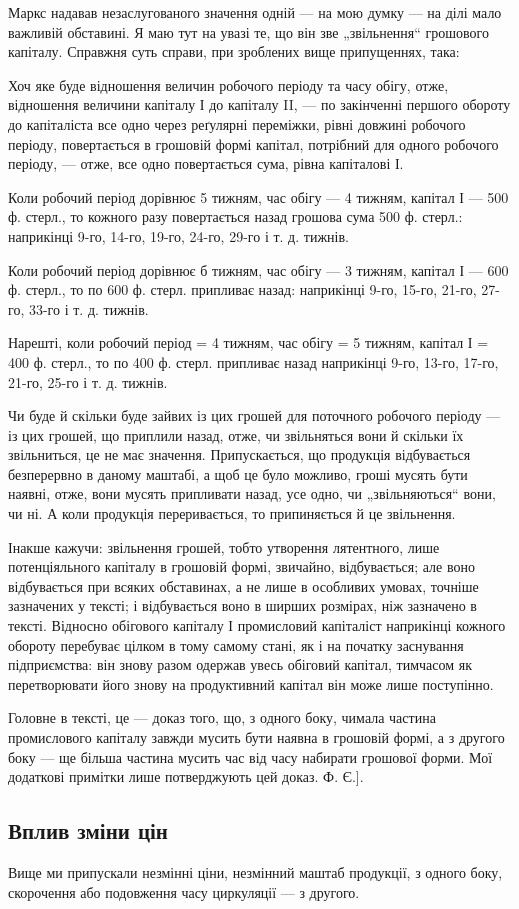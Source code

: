 \parcont{}  %
Маркс надавав незаслугованого значення одній — на мою думку — на ділі
мало важливій обставині. Я маю тут на увазі те, що він зве „звільнення“
грошового капіталу. Справжня суть справи, при зроблених вище припущеннях,
така:

Хоч яке буде відношення величин робочого періоду та часу обігу,
отже, відношення величини капіталу І до капіталу II, — по закінченні першого
обороту до капіталіста все одно через реґулярні переміжки, рівні
довжині робочого періоду, повертається в грошовій формі капітал, потрібний
для одного робочого періоду, — отже, все одно повертається сума,
рівна капіталові І.

Коли робочий період дорівнює 5 тижням, час обігу — 4 тижням, капітал
І — 500 ф. стерл., то кожного разу повертається назад грошова
сума 500 ф. стерл.: наприкінці 9-го, 14-го, 19-го, 24-го, 29-го і т. д.
тижнів.

Коли робочий період дорівнює б тижням, час обігу — 3 тижням, капітал
І — 600 ф. стерл., то по 600 ф. стерл. припливає назад: наприкінці
9-го, 15-го, 21-го, 27-го, 33-го і т. д. тижнів.

Нарешті, коли робочий період = 4 тижням, час обігу = 5 тижням,
капітал І = 400 ф. стерл., то по 400 ф. стерл. припливає назад наприкінці
9-го, 13-го, 17-го, 21-го, 25-го і т. д. тижнів.

Чи буде й скільки буде зайвих із цих грошей для поточного робочого
періоду — із цих грошей, що приплили назад, отже, чи звільняться
вони й скільки їх звільниться, це не має значення. Припускається, що
продукція відбувається безперервно в даному маштабі, а щоб це було
можливо, гроші мусять бути наявні, отже, вони мусять припливати назад,
усе одно, чи „звільняються“ вони, чи ні. А коли продукція переривається,
то припиняється й це звільнення.

Інакше кажучи: звільнення грошей, тобто утворення лятентного, лише
потенціяльного капіталу в грошовій формі, звичайно, відбувається;
але воно відбувається при всяких обставинах, а не лише в особливих умовах,
точніше зазначених у тексті; і відбувається воно в ширших розмірах,
ніж зазначено в тексті. Відносно обігового капіталу І промисловий капіталіст
наприкінці кожного обороту перебуває цілком в тому самому
стані, як і на початку заснування підприємства: він знову разом одержав
увесь обіговий капітал, тимчасом як перетворювати його знову на продуктивний
капітал він може лише поступінно.

Головне в тексті, це — доказ того, що, з одного боку, чимала частина
промислового капіталу завжди мусить бути наявна в грошовій формі,
а з другого боку — ще більша частина мусить час від часу набирати
грошової форми. Мої додаткові примітки лише потверджують цей доказ. Ф. Є.].

\subsection{Вплив зміни цін}

Вище ми припускали незмінні ціни, незмінний маштаб продукції, з
одного боку, скорочення або подовження часу циркуляції — з другого.
\parbreak{}  %
